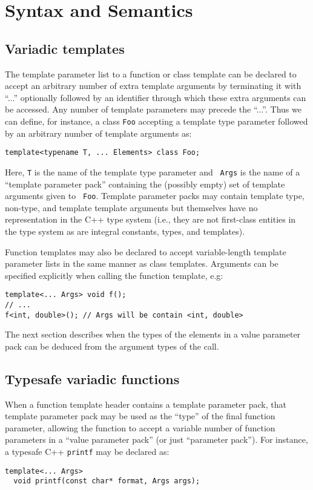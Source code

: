 \documentclass{article}
\begin{document}
\section{Syntax and Semantics}
\subsection{Variadic templates}
\par The template parameter list to a function or class template can
be declared to accept an arbitrary number of extra template arguments
by terminating it with ``...'' optionally followed by an identifier
through which these extra arguments can be accessed.
Any number of template
parameters may precede the ``...''. Thus we can define, for instance,
a class {\tt Foo} accepting a template type parameter followed by an
arbitrary number of template arguments as:
\begin{verbatim}
template<typename T, ... Elements> class Foo;
\end{verbatim}

\noindent
Here, {\tt T} is the name of the template type parameter and {\tt
  Args} is the name of a ``template parameter pack'' containing
the (possibly empty) set of template arguments given to {\tt
  Foo}. Template parameter packs may contain template type, non-type, and
template template arguments but themselves have no representation in
the C++ type system (i.e., they are not first-class entities in the
type system as are integral constants, types, and templates).

Function templates may also be declared to accept variable-length
template parameter lists in the same manner as class templates. 
Arguments can be specified explicitly when calling the function
template, e.g:

\begin{verbatim}
template<... Args> void f();
// ... 
f<int, double>(); // Args will be contain <int, double>
\end{verbatim}
The next section describes when the types of the elements in 
a value parameter pack can be deduced from the argument types
of the call. 

\subsection{Typesafe variadic functions}
When a function template header contains a template parameter pack,
that template parameter pack may be used as the ``type'' of the final
function parameter, allowing the function to accept a variable number
of function parameters in a ``value parameter pack'' (or just
``parameter pack''). For instance, a typesafe C++ {\tt printf} may
be declared as:
\begin{verbatim}
template<... Args>
  void printf(const char* format, Args args);
\end{verbatim}
\end{document}
